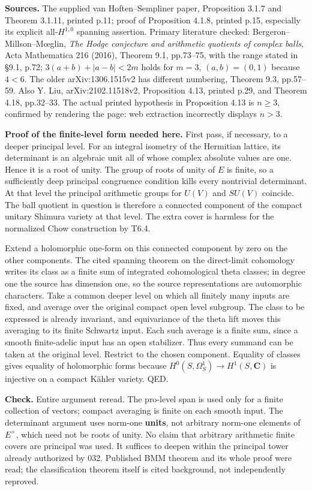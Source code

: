 \documentclass[11pt,a4paper]{article}
\theoremstyle{definition}
\begin{document}
\textbf{Sources.} The supplied van Hoften--Sempliner paper, Proposition
3.1.7 and Theorem 3.1.11, printed p.11; proof of Proposition 4.1.8,
printed p.15, especially its explicit all-\(H^{1,0}\) spanning
assertion. Primary literature checked: Bergeron--Millson--Mœglin,
\emph{The Hodge conjecture and arithmetic quotients of complex balls},
Acta Mathematica 216 (2016), Theorem 9.1, pp.73--75, with the range
stated in §9.1, p.72; \(3(a+b)+|a-b|<2m\) holds for \(m=3\),
\((a,b)=(0,1)\) because \(4<6\). The older arXiv:1306.1515v2 has
different numbering, Theorem 9.3, pp.57--59. Also Y. Liu,
arXiv:2102.11518v2, Proposition 4.13, printed p.29, and Theorem 4.18,
pp.32--33. The actual printed hypothesis in Proposition 4.13 is
\(n\ge3\), confirmed by rendering the page: web extraction incorrectly
displays \(n>3\).

\textbf{Proof of the finite-level form needed here.} First pass, if
necessary, to a deeper principal level. For an integral isometry of the
Hermitian lattice, its determinant is an algebraic unit all of whose
complex absolute values are one. Hence it is a root of unity. The group
of roots of unity of \(E\) is finite, so a sufficiently deep principal
congruence condition kills every nontrivial determinant. At that level
the principal arithmetic groups for \(U(V)\) and \(SU(V)\) coincide. The
ball quotient in question is therefore a connected component of the
compact unitary Shimura variety at that level. The extra cover is
harmless for the normalized Chow construction by T6.4.

Extend a holomorphic one-form on this connected component by zero on the
other components. The cited spanning theorem on the direct-limit
cohomology writes its class as a finite sum of integrated cohomological
theta classes; in degree one the source has dimension one, so the source
representations are automorphic characters. Take a common deeper level
on which all finitely many inputs are fixed, and average over the
original compact open level subgroup. The class to be expressed is
already invariant, and equivariance of the theta lift moves this
averaging to its finite Schwartz input. Each such average is a finite
sum, since a smooth finite-adelic input has an open stabilizer. Thus
every summand can be taken at the original level. Restrict to the chosen
component. Equality of classes gives equality of holomorphic forms
because \(H^0(S,\Omega^1_S)\to H^1(S,\mathbf C)\) is injective on a
compact Kähler variety. QED.

\textbf{Check.} Entire argument reread. The pro-level span is used only
for a finite collection of vectors; compact averaging is finite on each
smooth input. The determinant argument uses norm-one \textbf{units}, not
arbitrary norm-one elements of \(E^\times\), which need not be roots of
unity. No claim that arbitrary arithmetic finite covers are principal
was used. It suffices to deepen within the principal tower already
authorized by 032. Published BMM theorem and its whole proof were read;
the classification theorem itself is cited background, not independently
reproved.
\end{document}
